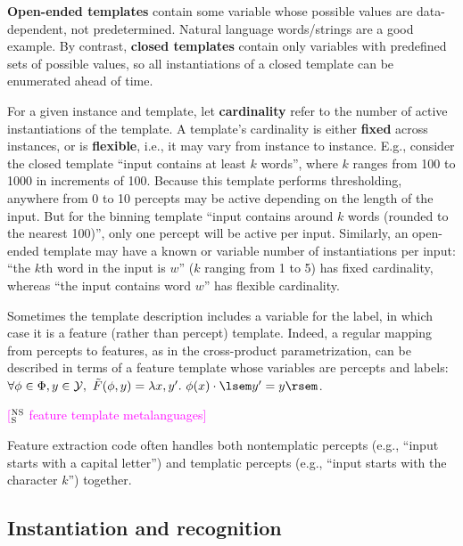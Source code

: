 \documentclass[11pt,letterpaper]{article}
\newcommand{\ensuretext}[1]{#1}
\newcommand{\nssmarker}{\ensuretext{\textcolor{magenta}{\ensuremath{^{\textsc{NS}}_{\textsc{S}}}}}}
\newcommand{\arkcomment}[3]{\ensuretext{\textcolor{#3}{[#1 #2]}}}
\newcommand{\nss}[1]{\arkcomment{\nssmarker}{#1}{magenta}}
\begin{document}
{\bf Open-ended templates} contain some variable whose possible values are data-dependent, not predetermined. 
Natural language words/strings are a good example.
By contrast, {\bf closed templates} contain only variables with predefined sets of possible values, 
so all instantiations of a closed template can be enumerated ahead of time. 

For a given instance and template, let \textbf{cardinality} refer to the number of active instantiations of the template.
A template's cardinality is either \textbf{fixed} across instances, or is \textbf{flexible}, i.e., it may vary from instance to instance.
E.g., consider the closed template ``input contains at least $k$ words'', where $k$ ranges from 100 to 1000 in increments of 100.
Because this template performs thresholding, anywhere from 0 to 10 percepts may be active depending on the length of the input.
But for the binning template ``input contains around $k$ words (rounded to the nearest 100)'', only one percept 
will be active per input. Similarly, an open-ended template may have a known or variable number of instantiations per input: 
``the $k$th word in the input is $w$'' ($k$ ranging from 1 to 5) has fixed cardinality, whereas 
``the input contains word $w$'' has flexible cardinality.

Sometimes the template description includes a variable for the label, 
in which case it is a feature (rather than percept) template.
Indeed, a regular mapping from percepts to features, 
as in the cross-product parametrization, can be described in terms of a feature template 
whose variables are percepts and labels: 
$\forall \phi\in\Phi, y\in\mathcal{Y},\ \tilde{F}(\phi,y) = \lambda x,y'.\ \phi(x) \cdot \lsem y'=y \rsem$.

\nss{feature template metalanguages}

Feature extraction code often handles both nontemplatic percepts (e.g., ``input starts with a capital letter'') 
and templatic percepts (e.g., ``input starts with the character $k$'') together.

\subsection{Instantiation and recognition}\label{sec:inst}
\end{document}
